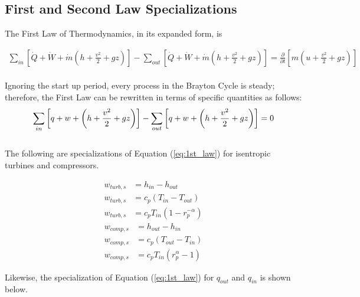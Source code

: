 \documentclass[
	12pt, %
]{brayton_cycle_report_style}
\begin{document}
\subsection{First and Second Law Specializations}
The First Law of Thermodynamics, in its expanded form, is

\begin{align*}
    \sum_{in} \left[ \dot{Q} + \dot{W} + \dot{m}\left(h + \frac{v^{2}}{2} + gz\right) \right] - \sum_{out} \left[\dot{Q} + \dot{W} + \dot{m}\left(h + \frac{v^{2}}{2} + gz\right) \right] = \frac{\partial}{\partial t} \left[m\left(u + \frac{v^{2}}{2} + gz\right)\right]
\end{align*}
\\
\noindent Ignoring the start up period, every process in the Brayton Cycle is steady; therefore, the First Law can be rewritten in terms of specific quantities as follows:
\\
\begin{equation}
    \sum_{in} \left[ {q} + w + \left(h + \frac{v^{2}}{2} + gz\right) \right] - \sum_{out} \left[q + w + \left(h + \frac{v^{2}}{2} + gz\right) \right] = 0
    \label{eq:1st_law} \\
\end{equation}
\\
\noindent The following are specializations of Equation (\ref{eq:1st_law}) for isentropic turbines and compressors.

\vspace{-5mm}

\begin{multicols}{2}
  \begin{align*}
    w_{turb,s} &= h_{in} - h_{out} \\
    w_{turb,s} &= c_{p}\left(T_{in} - T_{out}\right) \\
    w_{turb,s} &= c_{p}T_{in}\left(1 - r_{p}^{-\alpha}\right)
  \end{align*}
  \vspace{1mm}
  \begin{align*}
    w_{comp,s} &= h_{out} - h_{in} \\
    w_{comp,s} &= c_{p}\left(T_{out} - T_{in}\right) \\
    w_{comp,s} &= c_{p}T_{in}\left(r_{p}^{\alpha} - 1\right)
  \end{align*}
\end{multicols}
\noindent Likewise, the specialization of Equation (\ref{eq:1st_law}) for $q_{out}$ and $q_{in}$ is shown below.
\vspace{-5mm}
\end{document}
